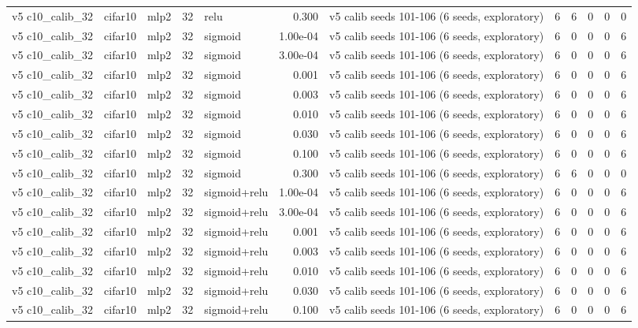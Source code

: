 \begin{table}[htbp]
{\begin{tabular}{@{}lllrlrlrrrrr@{}}
v5 c10\_calib\_32 & cifar10 & mlp2 & 32 & relu & 0.300 & v5 calib seeds 101-106 (6 seeds, exploratory) & 6 & 6 & 0 & 0 & 0 \\
v5 c10\_calib\_32 & cifar10 & mlp2 & 32 & sigmoid & 1.00e-04 & v5 calib seeds 101-106 (6 seeds, exploratory) & 6 & 0 & 0 & 0 & 6 \\
v5 c10\_calib\_32 & cifar10 & mlp2 & 32 & sigmoid & 3.00e-04 & v5 calib seeds 101-106 (6 seeds, exploratory) & 6 & 0 & 0 & 0 & 6 \\
v5 c10\_calib\_32 & cifar10 & mlp2 & 32 & sigmoid & 0.001 & v5 calib seeds 101-106 (6 seeds, exploratory) & 6 & 0 & 0 & 0 & 6 \\
v5 c10\_calib\_32 & cifar10 & mlp2 & 32 & sigmoid & 0.003 & v5 calib seeds 101-106 (6 seeds, exploratory) & 6 & 0 & 0 & 0 & 6 \\
v5 c10\_calib\_32 & cifar10 & mlp2 & 32 & sigmoid & 0.010 & v5 calib seeds 101-106 (6 seeds, exploratory) & 6 & 0 & 0 & 0 & 6 \\
v5 c10\_calib\_32 & cifar10 & mlp2 & 32 & sigmoid & 0.030 & v5 calib seeds 101-106 (6 seeds, exploratory) & 6 & 0 & 0 & 0 & 6 \\
v5 c10\_calib\_32 & cifar10 & mlp2 & 32 & sigmoid & 0.100 & v5 calib seeds 101-106 (6 seeds, exploratory) & 6 & 0 & 0 & 0 & 6 \\
v5 c10\_calib\_32 & cifar10 & mlp2 & 32 & sigmoid & 0.300 & v5 calib seeds 101-106 (6 seeds, exploratory) & 6 & 6 & 0 & 0 & 0 \\
v5 c10\_calib\_32 & cifar10 & mlp2 & 32 & sigmoid+relu & 1.00e-04 & v5 calib seeds 101-106 (6 seeds, exploratory) & 6 & 0 & 0 & 0 & 6 \\
v5 c10\_calib\_32 & cifar10 & mlp2 & 32 & sigmoid+relu & 3.00e-04 & v5 calib seeds 101-106 (6 seeds, exploratory) & 6 & 0 & 0 & 0 & 6 \\
v5 c10\_calib\_32 & cifar10 & mlp2 & 32 & sigmoid+relu & 0.001 & v5 calib seeds 101-106 (6 seeds, exploratory) & 6 & 0 & 0 & 0 & 6 \\
v5 c10\_calib\_32 & cifar10 & mlp2 & 32 & sigmoid+relu & 0.003 & v5 calib seeds 101-106 (6 seeds, exploratory) & 6 & 0 & 0 & 0 & 6 \\
v5 c10\_calib\_32 & cifar10 & mlp2 & 32 & sigmoid+relu & 0.010 & v5 calib seeds 101-106 (6 seeds, exploratory) & 6 & 0 & 0 & 0 & 6 \\
v5 c10\_calib\_32 & cifar10 & mlp2 & 32 & sigmoid+relu & 0.030 & v5 calib seeds 101-106 (6 seeds, exploratory) & 6 & 0 & 0 & 0 & 6 \\
v5 c10\_calib\_32 & cifar10 & mlp2 & 32 & sigmoid+relu & 0.100 & v5 calib seeds 101-106 (6 seeds, exploratory) & 6 & 0 & 0 & 0 & 6 \\

\end{tabular}}
\end{table}
